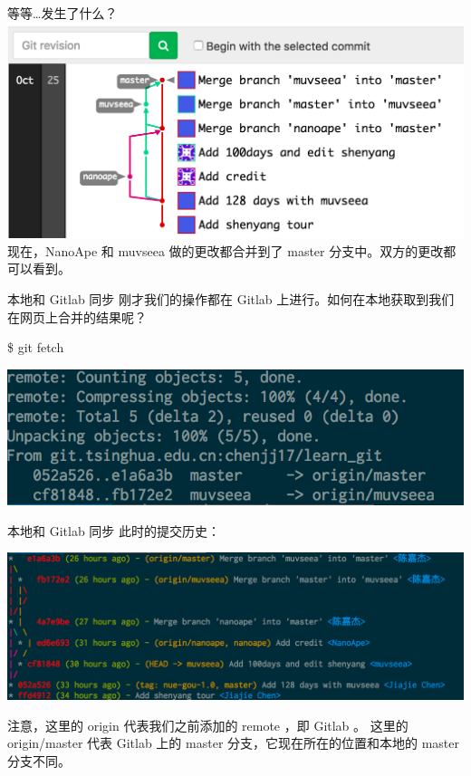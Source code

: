 \documentclass{beamer}
\begin{document}
\begin{frame}{等等\ldots 发生了什么？}
    \includegraphics[width=\linewidth]{2018-10-25-17-01-54.png}
    现在，NanoApe 和 muvseea 做的更改都合并到了 master 分支中。双方的更改都可以看到。
\end{frame}

\begin{frame}{本地和 Gitlab 同步}
    刚才我们的操作都在 Gitlab 上进行。如何在本地获取到我们在网页上合并的结果呢？

    \$ git fetch

    \includegraphics[width=\linewidth]{2018-10-26-19-25-28.png}
\end{frame}

\begin{frame}{本地和 Gitlab 同步}
    此时的提交历史：

    \includegraphics[width=\linewidth]{2018-10-26-19-27-09.png}
    
    注意，这里的 origin 代表我们之前添加的 remote ，即 Gitlab 。 这里的 origin/master 代表 Gitlab 上的 master 分支，它现在所在的位置和本地的 master 分支不同。
\end{frame}
\end{document}
